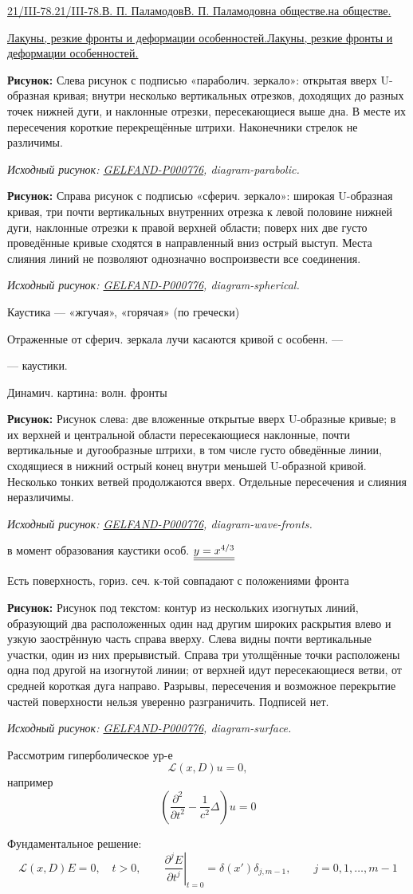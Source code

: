 \documentclass[11pt]{article}
\theoremstyle{definition}
\theoremstyle{remark}
\newcommand{\SourceFigure}[3]{%
  \par\begingroup\color{blue!60!black}\textbf{\hyperref[#1:source-page]{Source figure #1/#2}:} #3%
  \par\textit{Consult the authoritative scan at this locator.}\endgroup\par%
}
\renewcommand{\SourceFigure}[3]{%
  \par\begingroup\color{blue!55!black}\textbf{Рисунок:} #3%
  \par{\small\textit{Исходный рисунок: \hyperref[#1:source-page]{#1}, #2.}}%
  \endgroup\par%
}
\let\DiplomaticMathUnderline\underline
\renewcommand{\underline}[1]{\ifmmode\DiplomaticMathUnderline{#1}\else\uline{#1}\fi}
\begin{document}
\bigskip
\underline{21/III-78.}\qquad\underline{В. П. Паламодов}\qquad\underline{на обществе.}

\underline{Лакуны, резкие фронты и деформации особенностей.}

\SourceFigure{GELFAND-P000776}{diagram-parabolic}{Слева рисунок с подписью «параболич. зеркало»: открытая вверх U-образная кривая; внутри несколько вертикальных отрезков, доходящих до разных точек нижней дуги, и наклонные отрезки, пересекающиеся выше дна. В месте их пересечения короткие перекрещённые штрихи. Наконечники стрелок не различимы.}

\SourceFigure{GELFAND-P000776}{diagram-spherical}{Справа рисунок с подписью «сферич. зеркало»: широкая U-образная кривая, три почти вертикальных внутренних отрезка к левой половине нижней дуги, наклонные отрезки к правой верхней области; поверх них две густо проведённые кривые сходятся в направленный вниз острый выступ. Места слияния линий не позволяют однозначно воспроизвести все соединения.}

Каустика --- «жгучая», «горячая» (по гречески)

Отраженные от сферич. зеркала лучи касаются кривой с особенн. ---

--- каустики.

Динамич. картина: волн. фронты

\SourceFigure{GELFAND-P000776}{diagram-wave-fronts}{Рисунок слева: две вложенные открытые вверх U-образные кривые; в их верхней и центральной области пересекающиеся наклонные, почти вертикальные и дугообразные штрихи, в том числе густо обведённые линии, сходящиеся в нижний острый конец внутри меньшей U-образной кривой. Несколько тонких ветвей продолжаются вверх. Отдельные пересечения и слияния неразличимы.}

в момент образования каустики особ. $\underline{\underline{y=x^{4/3}}}$

Есть поверхность, гориз. сеч. к-той совпадают с положениями фронта

\SourceFigure{GELFAND-P000776}{diagram-surface}{Рисунок под текстом: контур из нескольких изогнутых линий, образующий два расположенных один над другим широких раскрытия влево и узкую заострённую часть справа вверху. Слева видны почти вертикальные участки, один из них прерывистый. Справа три утолщённые точки расположены одна под другой на изогнутой линии; от верхней идут пересекающиеся ветви, от средней короткая дуга направо. Разрывы, пересечения и возможное перекрытие частей поверхности нельзя уверенно разграничить. Подписей нет.}

Рассмотрим гиперболическое ур-е
\begin{equation}
\mathcal{L}(x,D)u=0, \tag{1}
\end{equation}
например
\begin{equation}
\left(\frac{\partial^2}{\partial t^2}-\frac{1}{c^2}\Delta\right)u=0 \tag{2}
\end{equation}

Фундаментальное решение:
\begin{equation}
\mathcal{L}(x,D)E=0,\quad t>0,\qquad
\left.\frac{\partial^jE}{\partial t^j}\right|_{t=0}
 =\delta(x')\delta_{j,m-1},\qquad
j=0,1,\ldots,m-1 \tag{3}
\end{equation}
\end{document}
